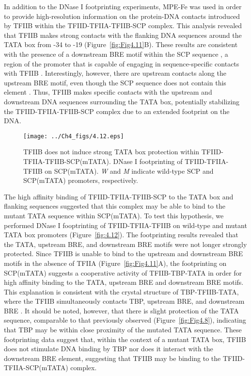 \indent In addition to the DNase I footprinting experiments, MPE-Fe was used in order to provide high-resolution information on the protein-DNA contacts introduced by TFIIB within the TFIID-TFIIA-TFIIB-SCP complex. This analysis revealed that TFIIB makes strong contacts with the flanking DNA sequences around the TATA box from -34 to -19 (Figure~\ref{fig:Fig4.11}B). These results are consistent with the presence of a downstream BRE motif within the SCP sequence \cite{Juven-Gershon_1249}, a region of the promoter that is capable of engaging in sequence-specific contacts with TFIIB \cite{Deng_2005,Tsai_2000}. Interestingly, however, there are upstream contacts along the upstream BRE motif, even though the SCP sequence does not contain this element \cite{Juven-Gershon_1249}. Thus, TFIIB makes specific contacts with the upstream and downstream DNA sequences surrounding the TATA box, potentially stabilizing the TFIID-TFIIA-TFIIB-SCP complex due to an extended footprint on the DNA. \\
\begin{figure}
\centering
\texttt{[image: ../Ch4\_figs/4.12.eps]}
\caption[TFIIB does not induce strong TATA box protection within TFIID-TFIIA-TFIIB-SCP(mTATA)]{TFIIB does not induce strong TATA box protection within TFIID-TFIIA-TFIIB-SCP(mTATA). DNase I footprinting of TFIID-TFIIA-TFIIB on SCP(mTATA). \emph{W} and \emph{M} indicate wild-type SCP and SCP(mTATA) promoters, respectively. }
\label{fig:Fig4.12}
\end{figure}
\indent The high affinity binding of TFIID-TFIIA-TFIIB-SCP to the TATA box and flanking sequences suggested that this complex may be able to bind to the mutant TATA sequence within SCP(mTATA). To test this hypothesis, we performed DNase I fooptrinting of TFIID-TFIIA-TFIIB on wild-type and mutant TATA box promoters (Figure~\ref{fig:4.12}). The footprinting results revealed that the TATA, upstream BRE, and downstream BRE motifs were not longer strongly protected. Since TFIIB is unable to bind to the upstream and downstream BRE motifs in the absence of TFIIA (Figure~\ref{fig:Fig4.11}A), the footprinting on SCP(mTATA) suggests a cooperative activity of TFIIB-TBP-TATA in order for high affinity binding to the TATA, upstream BRE and downstream BRE motifs. This explanation is consistent with the crystal structure of TBP-TFIIB-TATA, where the TFIIB simultaneously contacts TBP, upstream BRE, and downstream BRE \cite{Tsai_2000}. It should be noted, however, that there is slight protection of the TATA sequence, comparable to that previously observed (Figure~\ref{fig:Fig4.8}), indicating that TBP may be within close proximity of the mutated TATA sequence. These footprinting data suggest that, within the context of a mutant TATA box, TFIIB does not stimulate DNA binding by TBP nor does it interact with the downstream BRE element, suggesting that TFIIB may be binding to the TFIID-TFIIA-SCP(mTATA) complex.\\
